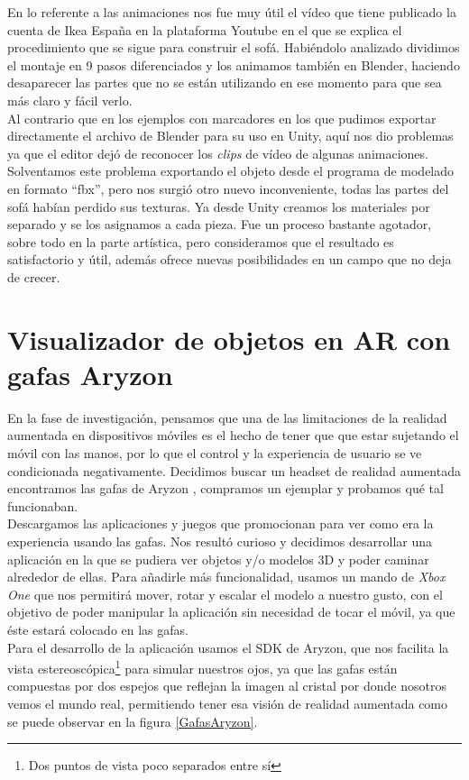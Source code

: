 En lo referente a las animaciones nos fue muy útil el vídeo que tiene publicado la cuenta de Ikea España en la plataforma Youtube \cite{IkeaYT} en el que se explica el procedimiento que se sigue para construir el sofá. Habiéndolo analizado dividimos el montaje en 9 pasos diferenciados y los animamos también en Blender, haciendo desaparecer las partes que no se están utilizando en ese momento para que sea más claro y fácil verlo.\\

Al contrario que en los ejemplos con marcadores en los que pudimos exportar directamente el archivo de Blender para su uso en Unity, aquí nos dio problemas ya que el editor dejó de reconocer los \textit{clips} de vídeo de algunas animaciones. Solventamos este problema exportando el objeto desde el programa de modelado en formato ``fbx'', pero nos surgió otro nuevo inconveniente, todas las partes del sofá habían perdido sus texturas. Ya desde Unity creamos los materiales por separado y se los asignamos a cada pieza.
Fue un proceso bastante agotador, sobre todo en la parte artística, pero consideramos que el resultado es satisfactorio y útil, además ofrece nuevas posibilidades en un campo que no deja de crecer.

\clearpage
\section{Visualizador de objetos en AR con gafas Aryzon}
En la fase de investigación, pensamos que una de las limitaciones de la realidad aumentada en dispositivos móviles es el hecho de tener que que estar sujetando el móvil con las manos, por lo que el control y la experiencia de usuario se ve condicionada negativamente. Decidimos buscar un headset de realidad aumentada encontramos las gafas de Aryzon \cite{Aryzon}, compramos un ejemplar y probamos qué tal funcionaban.\\

Descargamos las aplicaciones y juegos que promocionan para ver como era la experiencia usando las gafas. Nos resultó curioso y decidimos desarrollar una aplicación en la que se pudiera ver objetos y/o modelos 3D y poder caminar alrededor de ellas. Para añadirle más funcionalidad, usamos un mando de \textit{Xbox One} que nos permitirá mover, rotar y escalar el modelo a nuestro gusto, con el objetivo de poder manipular la aplicación sin necesidad de tocar el móvil, ya que éste estará colocado en las gafas.\\

Para el desarrollo de la aplicación usamos el SDK de Aryzon, que nos facilita la vista estereoscópica\footnote{ Dos puntos de vista poco separados entre sí} para simular nuestros ojos, ya que las gafas están compuestas por dos espejos que reflejan la imagen al cristal por donde nosotros vemos el mundo real, permitiendo tener esa visión de realidad aumentada como se puede observar en la figura \ref{GafasAryzon}.

